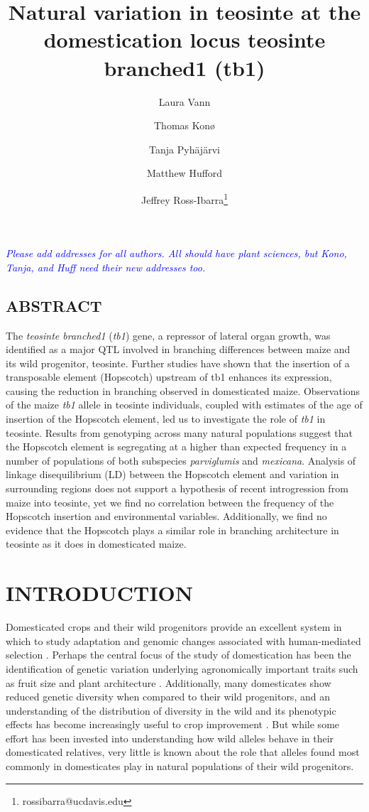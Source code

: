\documentclass[12pt]{article}
\title{Natural variation in teosinte at the domestication locus teosinte branched1 (tb1)}
\author[1]{Laura Vann}
\author[1]{Thomas Kon\o}
\author[1]{Tanja Pyh\"aj\"arvi}
\author[1]{Matthew Hufford}
\author[1,2]{Jeffrey Ross-Ibarra\thanks{rossibarra@ucdavis.edu}}
\affil[1]{Department of Plant Sciences, University of California Davis}
\affil[2]{Center for Population Biology and Genome Center, University of California Davis}
\date{}
\newcommand{\jri}[1]{\textcolor{blue}{ \emph{\scriptsize  #1}} }
\begin{document}
\maketitle

\jri{Please add addresses for all authors.  All should have plant sciences, but Kono, Tanja, and Huff need their new addresses too. }

\subsection*{ABSTRACT}

The \emph{teosinte branched1} (\emph{tb1}) gene, a repressor of lateral organ growth, was identified as a major QTL involved in branching differences between maize and its wild progenitor, teosinte. Further studies have shown that the insertion of a transposable element (Hopscotch) upstream of tb1 enhances its expression, causing the reduction in branching observed in domesticated maize. Observations of the maize \emph{tb1} allele in teosinte individuals, coupled with estimates of the age of insertion of the Hopscotch element, led us to investigate the role of \emph{tb1} in teosinte. Results from genotyping across many natural populations suggest that the Hopscotch element is segregating at a higher than expected frequency in a number of populations of both subspecies \emph{parviglumis} and \emph{mexicana}. Analysis of linkage disequilibrium (LD) between the Hopscotch element and variation in surrounding regions does not support a hypothesis of recent introgression from maize into teosinte, yet we find no correlation between the frequency of the Hopscotch insertion and environmental variables. Additionally, we find no evidence that the Hopscotch plays a similar role in branching architecture in teosinte as it does in domesticated maize. 


\section{INTRODUCTION}

Domesticated crops and their wild progenitors provide an excellent system in which to study adaptation and genomic changes associated with human-mediated selection \cite{Ross-Ibarra et al 2007}. Perhaps the central focus of the study of domestication has been the identification of genetic variation underlying agronomically important traits such as fruit size and plant architecture \cite{Olsen and Gross 2010}. Additionally, many domesticates show reduced genetic diversity when compared to their wild progenitors, and an understanding of the distribution of diversity in the wild and its phenotypic effects has become increasingly useful to crop improvement \cite{Kovach and McCouch 2008}. But while some effort has been invested into understanding how wild alleles behave in their domesticated relatives, very little is known about the role that alleles found most commonly in domesticates play in natural populations of their wild progenitors.
\end{document}
